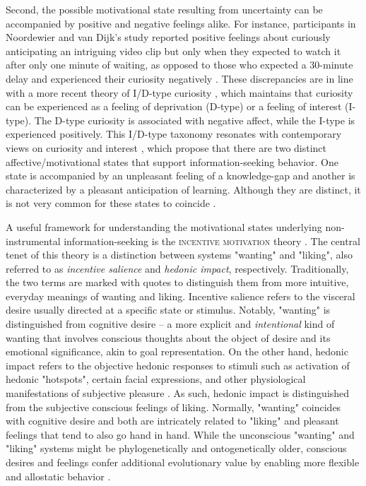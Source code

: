 Second, the possible motivational state resulting from uncertainty can be accompanied by positive and negative feelings alike. For instance, participants in Noordewier and van Dijk's study \cite{noordewier_curiosity_2017} reported positive feelings about curiously anticipating an intriguing video clip but only when they expected to watch it after only one minute of waiting, as opposed to those who expected a 30-minute delay and experienced their curiosity negatively \cite[but see][]{van_lieshout_curiosity_2020}. These discrepancies are in line with a more recent theory of I/D-type curiosity \cite{litman_curiosity_2019}, which maintains that curiosity can be experienced as a feeling of deprivation (D-type) or a feeling of interest (I-type). The D-type curiosity is associated with negative affect, while the I-type is experienced positively. This I/D-type taxonomy resonates with contemporary views on curiosity and interest \cite[e.g., ][]{hidi_interest_2019,shin_homo_2019,murayama_process_2019}, which propose that there are two distinct affective/motivational states that support information-seeking behavior. One state is accompanied by an unpleasant feeling of a knowledge-gap and another is characterized by a pleasant anticipation of learning. Although they are distinct, it is not very common for these states to coincide \cite{hidi_interest_2019}.

A useful framework for understanding the motivational states underlying non-instrumental information-seeking is the \textsc{incentive motivation} theory \cite{berridge_wanting_2009,robinson_roles_2016}. The central tenet of this theory is a distinction between systems "wanting" and "liking", also referred to as \emph{incentive salience} and \emph{hedonic impact}, respectively. Traditionally, the two terms are marked with quotes to distinguish them from more intuitive, everyday meanings of wanting and liking. Incentive salience refers to the visceral desire usually directed at a specific state or stimulus.  Notably, "wanting" is distinguished from cognitive desire -- a more explicit and \emph{intentional} kind of wanting that involves conscious thoughts about the object of desire and its emotional significance, akin to goal representation. On the other hand, hedonic impact refers to the objective hedonic responses to stimuli such as activation of hedonic "hotspots", certain facial expressions, and other physiological manifestations of subjective pleasure \cite{berridge_pleasure_2015}. As such, hedonic impact is distinguished from the subjective conscious feelings of liking. Normally, "wanting" coincides with cognitive desire and both are intricately related to "liking" and pleasant feelings that tend to also go hand in hand. While the unconscious "wanting" and "liking" systems might be phylogenetically and ontogenetically older, conscious desires and feelings confer additional evolutionary value by enabling more flexible and allostatic behavior \cite{damasio_nature_2013}.

